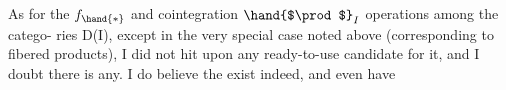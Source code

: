As for the $f_{\hand{*}}$ and cointegration $\hand{$\prod$}_I$ operations among the catego-%
ries D(I), except in the very special case noted above (corresponding to
fibered products), I did not hit upon any ready-to-use candidate for it,
and I doubt there is any. I do believe the  exist indeed, and  even have

